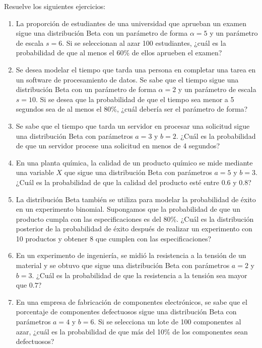 \begin{Ejer}
Resuelve los siguientes ejercicios:
\begin{enumerate}

\item La proporción de estudiantes de una universidad que aprueban un examen sigue una distribución Beta con un parámetro de forma $\alpha=5$ y un parámetro de escala $s=6$. Si se seleccionan al azar 100 estudiantes, ¿cuál es la probabilidad de que al menos el 60\% de ellos aprueben el examen?

\item Se desea modelar el tiempo que tarda una persona en completar una tarea en un software de procesamiento de datos. Se sabe que el tiempo sigue una distribución Beta con un parámetro de forma $\alpha=2$ y un parámetro de escala $s=10$. Si se desea que la probabilidad de que el tiempo sea menor a 5 segundos sea de al menos el 80\%, ¿cuál debería ser el parámetro de forma?

\item Se sabe que el tiempo que tarda un servidor en procesar una solicitud sigue una distribución Beta con parámetros $a=3$ y $b=2$. ¿Cuál es la probabilidad de que un servidor procese una solicitud en menos de 4 segundos?

\item En una planta química, la calidad de un producto químico se mide mediante una variable $X$ que sigue una distribución Beta con parámetros $a=5$ y $b=3$. ¿Cuál es la probabilidad de que la calidad del producto esté entre $0.6$ y $0.8$?

\item La distribución Beta también se utiliza para modelar la probabilidad de éxito en un experimento binomial. Supongamos que la probabilidad de que un producto cumpla con las especificaciones es del 80\%. ¿Cuál es la distribución posterior de la probabilidad de éxito después de realizar un experimento con 10 productos y obtener 8 que cumplen con las especificaciones?

\item En un experimento de ingeniería, se midió la resistencia a la tensión de un material y se obtuvo que sigue una distribución Beta con parámetros $a=2$ y $b=3$. ¿Cuál es la probabilidad de que la resistencia a la tensión sea mayor que $0.7$?

\item En una empresa de fabricación de componentes electrónicos, se sabe que el porcentaje de componentes defectuosos sigue una distribución Beta con parámetros $a=4$ y $b=6$. Si se selecciona un lote de 100 componentes al azar, ¿cuál es la probabilidad de que más del 10\% de los componentes sean defectuosos?


\end{enumerate}
\end{Ejer}
